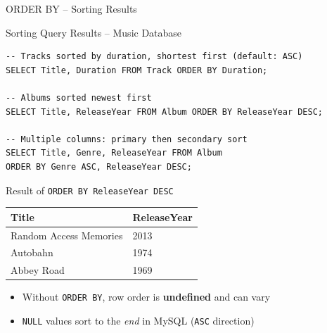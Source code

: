 \begin{frame}[fragile]{ORDER BY -- Sorting Results}
  \begin{block}{Sorting Query Results -- Music Database}
\begin{lstlisting}[style=sqlstyle]
-- Tracks sorted by duration, shortest first (default: ASC)
SELECT Title, Duration FROM Track ORDER BY Duration;

-- Albums sorted newest first
SELECT Title, ReleaseYear FROM Album ORDER BY ReleaseYear DESC;

-- Multiple columns: primary then secondary sort
SELECT Title, Genre, ReleaseYear FROM Album
ORDER BY Genre ASC, ReleaseYear DESC;
\end{lstlisting}
  \end{block}

  \begin{block}{Result of \texttt{ORDER BY ReleaseYear DESC}}
    \begin{tabular}{@{}ll@{}}
      \toprule
      \textbf{Title} & \textbf{ReleaseYear} \\
      \midrule
      Random Access Memories & 2013 \\
      Autobahn & 1974 \\
      Abbey Road & 1969 \\
      \bottomrule
    \end{tabular}
  \end{block}

  \begin{itemize}
    \item Without \texttt{ORDER BY}, row order is \textbf{undefined} and can vary
    \item \texttt{NULL} values sort to the \emph{end} in MySQL (\texttt{ASC} direction)
  \end{itemize}
\end{frame}

